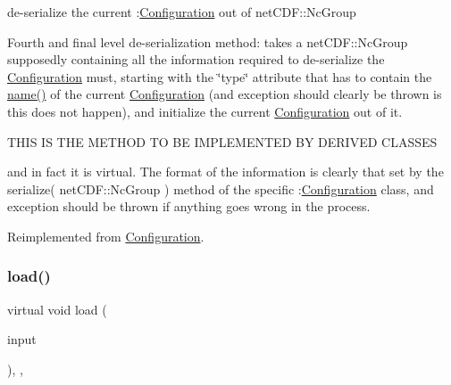 de-\/serialize the current \+:\mbox{\hyperlink{class_s_m_spp__di__unipi__it_1_1_configuration}{Configuration}} out of net\+C\+D\+F\+::\+Nc\+Group 

Fourth and final level de-\/serialization method\+: takes a net\+C\+D\+F\+::\+Nc\+Group supposedly containing all the information required to de-\/serialize the \mbox{\hyperlink{class_s_m_spp__di__unipi__it_1_1_configuration}{Configuration}} must, starting with the \char`\"{}type\char`\"{} attribute that has to contain the \mbox{\hyperlink{class_s_m_spp__di__unipi__it_1_1_configuration_a738e9dfd6e00507da219e4bd5a3f6be9}{name()}} of the current \mbox{\hyperlink{class_s_m_spp__di__unipi__it_1_1_configuration}{Configuration}} (and exception should clearly be thrown is this does not happen), and initialize the current \mbox{\hyperlink{class_s_m_spp__di__unipi__it_1_1_configuration}{Configuration}} out of it. \begin{DoxyVerb} THIS IS THE METHOD TO BE IMPLEMENTED BY DERIVED CLASSES
\end{DoxyVerb}


and in fact it is virtual. The format of the information is clearly that set by the serialize( net\+C\+D\+F\+::\+Nc\+Group ) method of the specific \+:\mbox{\hyperlink{class_s_m_spp__di__unipi__it_1_1_configuration}{Configuration}} class, and exception should be thrown if anything goes wrong in the process. 

Reimplemented from \mbox{\hyperlink{class_s_m_spp__di__unipi__it_1_1_configuration_af03cd244e01fc59411ed4fcd6bd92949}{Configuration}}.

\mbox{\label{class_s_m_spp__di__unipi__it_1_1_block_solver_config_a019850055afe817b816bae5699f461d3}} 
\subsubsection{\texorpdfstring{load()}{load()}}
{\footnotesize\ttfamily virtual void load (\begin{DoxyParamCaption}\item[{std\+::istream \&}]{input }\end{DoxyParamCaption})\hspace{0.3cm}{\ttfamily [override]}, {\ttfamily [protected]}, {\ttfamily [virtual]}}



